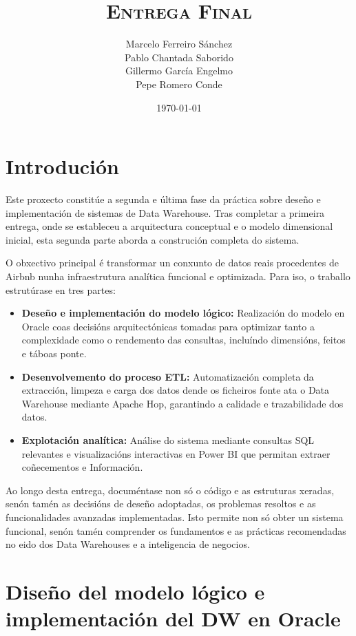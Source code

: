 \documentclass[12pt,a4paper]{article}
\title{\textsc{Entrega Final}}
\author{Marcelo Ferreiro Sánchez\\ Pablo Chantada Saborido\\  Gillermo García Engelmo\\ Pepe Romero Conde}
\date{\today}
\begin{document}
\maketitle

\tableofcontents

\newpage

\section{Introdución}

Este proxecto constitúe a segunda e última fase da práctica sobre deseño e
implementación de sistemas de Data Warehouse. Tras completar a primeira entrega,
onde se estableceu a arquitectura conceptual e o modelo dimensional inicial,
esta segunda parte aborda a construción completa do sistema.

O obxectivo principal é transformar un conxunto de datos reais procedentes de
Airbnb nunha infraestrutura analítica funcional e optimizada. Para iso, o
traballo estrutúrase en tres partes:

\begin{itemize}
	\item \textbf{Deseño e implementación do modelo lógico:} Realización do
	modelo en Oracle coas decisións arquitectónicas tomadas para optimizar tanto
	a complexidade como o rendemento das consultas, incluíndo dimensións, feitos
	e táboas ponte.
	\item \textbf{Desenvolvemento do proceso ETL:} Automatización completa da
	extracción, limpeza e carga dos datos dende os ficheiros fonte ata o Data
	Warehouse mediante Apache Hop, garantindo a calidade e trazabilidade dos
	datos.
	\item \textbf{Explotación analítica:} Análise do sistema mediante consultas
	SQL relevantes e visualizacións interactivas en Power BI que permitan
	extraer coñecementos e Información.
\end{itemize}

Ao longo desta entrega, documéntase non só o código e as estruturas xeradas,
senón tamén as decisións de deseño adoptadas, os problemas resoltos e as
funcionalidades avanzadas implementadas. Isto permite non só obter un sistema
funcional, senón tamén comprender os fundamentos e as prácticas recomendadas no
eido dos Data Warehouses e a inteligencia de negocios.

\section{Diseño del modelo lógico e implementación del DW en Oracle}
\end{document}
